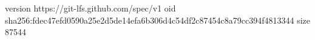 version https://git-lfs.github.com/spec/v1
oid sha256:fdec47efd0590a25e2d5de14efa6b306d4c54df2c87454c8a79cc394f4813344
size 87544
